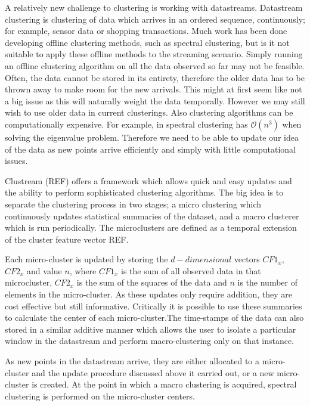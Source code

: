 \documentclass[a4document]{article}		%
\begin{document}
A relatively new challenge to clustering is working with datastreams. Datastream clustering is clustering of data which arrives in an ordered sequence, continuously; for example, sensor data or shopping transactions. Much work has been done developing offline clustering methods, such as spectral clustering, but is it not suitable to apply these offline methods to the streaming scenario. Simply running an offline clustering algorithm on all the data observed so far may not be feasible. Often, the data cannot be stored in its entirety, therefore the older data has to be thrown away to make room for the new arrivals. This might at first seem like not a big issue as this will naturally weight the data temporally. However we may still wish to use older data in current clusterings. Also clustering algorithms can be computationally expensive. For example, in spectral clustering has $\mathcal{O}(n^3)$ when solving the eigenvalue problem. Therefore we need to be able to update our idea of the data as new points arrive efficiently and simply with little computational issues. 

Clustream (REF) offers a framework which allows quick and easy updates and the ability to perform sophisticated clustering algorithms. The big idea is to separate the clustering process in two stages;  a micro clustering which continuously updates statistical summaries of the dataset, and a macro clusterer which is run periodically. The microclusters are defined as a temporal extension of the cluster feature vector REF. 

Each micro-cluster is updated by storing the $d-dimensional$ vectors $CF1_x$, $CF2_x$ and value $n$, where $CF1_x$ is the sum of all observed data in that microcluster, $CF2_x$ is the sum of the squares of the data and $n$ is the number of elements in the micro-cluster. As these updates only require addition, they are cost effective but still informative. Critically it is possible to use these summaries to calculate the center of each micro-cluster.The time-stamps of the data can also stored in a similar additive manner which allows the user to isolate a particular window in the datastream and perform macro-clustering only on that instance. 

As new points in the datastream arrive, they are either allocated to a micro-cluster and the update procedure discussed above it carried out, or a new micro-cluster is created. At the point in which a macro clustering is acquired, spectral clustering is performed on the micro-cluster centers.
\end{document}
